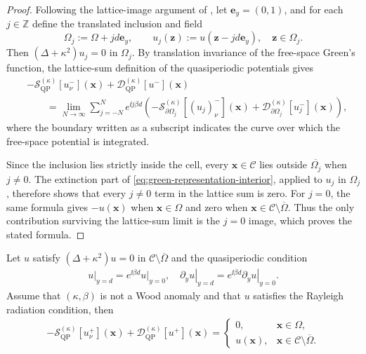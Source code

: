 \begin{proof}
Following the lattice-image argument of
\cite[Appendix~A, Lemma~9]{BarnettGreengard2010}, let
\(\mathbf e_y=(0,1)\), and for each \(j\in\mathbb Z\) define the translated
inclusion and field
\[
  \Omega_j:=\Omega+jd\mathbf e_y,
  \qquad
  u_j(\mathbf z):=u(\mathbf z-jd\mathbf e_y),
  \quad \mathbf z\in\Omega_j.
\]
Then \((\Delta+\kappa^2)u_j=0\) in \(\Omega_j\). By translation invariance of
the free-space Green's function, the lattice-sum definition of the
quasiperiodic potentials gives
\begin{align*}
  &-\mathcal S_\mathrm{QP}^{(\kappa)}[u_\nu^-](\mathbf x)
  +\mathcal D_\mathrm{QP}^{(\kappa)}[u^-](\mathbf x)\\
  &\qquad=
  \lim_{N\to\infty}\sum_{j=-N}^{N}e^{\ii j\beta d}
  \left(
    -\mathcal S_{\partial\Omega_j}^{(\kappa)}[(u_j)_\nu^-](\mathbf x)
    +\mathcal D_{\partial\Omega_j}^{(\kappa)}[u_j^-](\mathbf x)
  \right),
\end{align*}
where the boundary written as a subscript indicates the curve over which the
free-space potential is integrated.

Since the inclusion lies strictly inside the cell, every
\(\mathbf x\in\mathcal C\) lies outside \(\overline{\Omega_j}\) when
\(j\neq0\). The extinction part of
\eqref{eq:green-representation-interior}, applied to \(u_j\) in \(\Omega_j\),
therefore shows that every \(j\neq0\) term in the lattice sum is zero. For
\(j=0\), the same formula gives \(-u(\mathbf x)\) when
\(\mathbf x\in\Omega\) and zero when
\(\mathbf x\in\mathcal C\setminus\overline\Omega\). Thus the only
contribution surviving the lattice-sum limit is the \(j=0\) image, which
proves the stated formula.
\end{proof}


\begin{lemma}
\label{lem:qp-exterior-green-representation}
Let $u$ satisfy $(\Delta+\kappa^2)u=0$ in $\mathcal{C}\setminus\overline{\Omega}$ and the quasiperiodic condition \begin{align*}
  \left. u \right|_{y = d} = e^{\ii \beta d} \left. u \right|_{y = 0}, \quad
\left. \partial_y u \right|_{y = d} = e^{\ii \beta d} \left. \partial_y u \right|_{y = 0}.
\end{align*}
Assume that $(\kappa, \beta)$ is not a Wood anomaly and that \(u\) satisfies the Rayleigh radiation condition, then
\begin{align}
  -\mathcal{S}^{(\kappa)}_\mathrm{QP}[u_\nu^+](\mathbf{x})
  +\mathcal{D}^{(\kappa)}_\mathrm{QP}[u^+](\mathbf{x})
  =
  \begin{cases}
    0, & \mathbf{x}\in\Omega,\\
    u(\mathbf{x}), & \mathbf{x}\in \mathcal{C}\setminus\overline{\Omega}.
  \end{cases} \label{eq:qp-exterior-green-representation}
\end{align}
\end{lemma}

